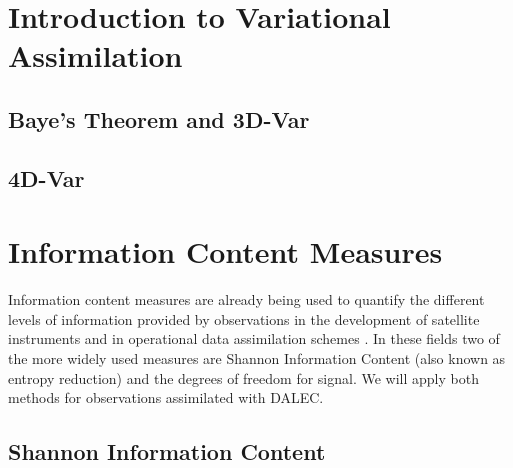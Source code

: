 \documentclass[11pt]{article}
\begin{document}
\section{Introduction to Variational Assimilation}

\subsection{Baye's Theorem and 3D-Var}

\subsection{4D-Var}

\section{Information Content Measures}

Information content measures are already being used to quantify the different levels of information provided by observations in the development of satellite instruments \cite{stewart2008correlated, engelen2004information} and in operational data assimilation schemes \cite{fisher2003estimation, sandu2012practical}. In these fields two of the more widely used measures are Shannon Information Content (also known as entropy reduction) and the degrees of freedom for signal. We will apply both methods for observations assimilated with DALEC. 

\subsection{Shannon Information Content}
\end{document}
